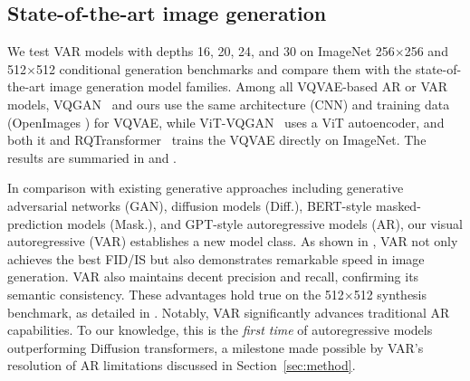\subsection{State-of-the-art image generation} \label{sec:sota}
\vspace{-0.8pt}

We test VAR models with depths 16, 20, 24, and 30 on ImageNet 256$\times$256 and 512$\times$512 conditional generation benchmarks and compare them with the state-of-the-art image generation model families.
Among all VQVAE-based AR or VAR models, VQGAN~\cite{vqgan} and ours use the same architecture (CNN) and training data (OpenImages \cite{openimages}) for VQVAE, while ViT-VQGAN~\cite{vit-vqgan} uses a ViT autoencoder, and both it and RQTransformer~\cite{rq} trains the VQVAE directly on ImageNet.
The results are summaried in  and .

In comparison with existing generative approaches including generative adversarial networks (GAN), diffusion models (Diff.), BERT-style masked-prediction models (Mask.), and GPT-style autoregressive models (AR), our visual autoregressive (VAR) establishes a new model class.
As shown in , VAR not only achieves the best FID/IS but also demonstrates remarkable speed in image generation.
VAR also maintains decent precision and recall, confirming its semantic consistency.
These advantages hold true on the 512$\times$512 synthesis benchmark, as detailed in .
Notably, VAR significantly advances traditional AR capabilities. To our knowledge, this is the \textit{first time} of autoregressive models outperforming Diffusion transformers, a milestone made possible by VAR's resolution of AR limitations discussed in Section~\ref{sec:method}.

